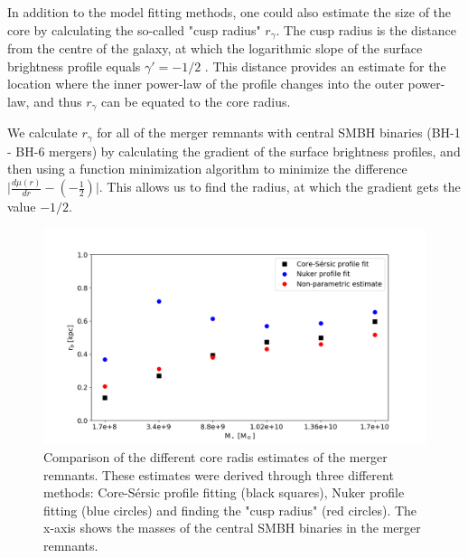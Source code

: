 \documentclass[english, oneside]{HYgradu}
\begin{document}
In addition to the model fitting methods, one could also estimate the size of the core by calculating the so-called "cusp radius" $r_\gamma$. The cusp radius is the distance from the centre of the galaxy, at which the logarithmic slope of the surface brightness profile equals $\gamma' = -1/2$ \citep{Carollo1997, Lauer2007Cusp}. This distance provides an estimate for the location where the inner power-law of the profile changes into the outer power-law, and thus $r_\gamma$ can be equated to the core radius. 

We calculate $r_\gamma$ for all of the merger remnants with central SMBH binaries (BH-1 - BH-6 mergers) by calculating the gradient of the surface brightness profiles, and then using a function minimization algorithm \citep{NelderMead} to minimize the difference $\big| \frac{d\mu(r)}{dr} - \left( - \frac{1}{2} \right) \big|$. This allows us to find the radius, at which the gradient gets the value $-1/2$. 

\begin{figure}[h]
	\centering
	\includegraphics[width=\textwidth]{rb_mass_relation.png}
	\caption{Comparison of the different core radis estimates of the merger remnants. These estimates were derived through three different methods: Core-Sérsic profile fitting (black squares), Nuker profile fitting (blue circles) and  finding the "cusp radius" (red circles). The x-axis shows the masses of the central SMBH binaries in the merger remnants.}
	\label{figure:radii_comparison}
\end{figure}
\end{document}

